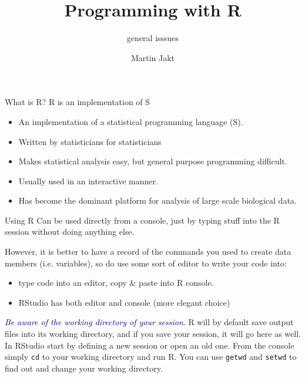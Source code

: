\documentclass[pdf]{beamer}
\title{Programming with R}
\subtitle{general isssues}
\author{Martin Jakt}
\begin{document}
\begin{frame}
\titlepage
\end{frame}

\begin{frame}{What is R?}
  \pause
  R is an implementation of S
  \pause
  
  {\small
  \begin{itemize}
  \item An implementation of a statistical programming language (S).
  \item Written by statisticians for statisticians
  \item Makes statistical analysis easy, but general purpose programming difficult.
  \item Usually used in an interactive manner.
  \item Has become the dominant platform for analysis of large scale biological data.
  \end{itemize}
  }
\end{frame}

\begin{frame}{Using R}
  Can be used directly from a console, just by typing stuff into the
  R session without doing anything else. 

  However, it is better to have a record of the commands you used to create
  data members (i.e. variables), so do use some sort of editor to write your code
  into:
  \begin{itemize}
  \item type code into an editor, copy \& paste into R console.\\
  \item RStudio has both editor and console (more elegant choice)
  \end{itemize}

  \textcolor{navy}{\emph{Be aware of the working directory of your session}}. R will by default save
  output files into its working directory, and if you save your session, it will go
  here as well. In RStudio start by defining a new session or open an old one. From
  the console simply \texttt{cd} to your working directory and run R. You can use
  \texttt{getwd} and \texttt{setwd} to find out and change your working directory.

\end{frame}
\end{document}
